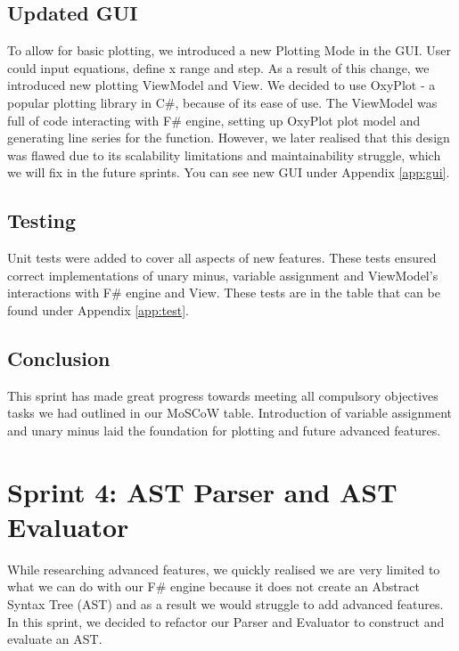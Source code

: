 \documentclass[a4paper, oneside, 11pt]{report}
\begin{document}
\subsection{Updated GUI}
To allow for basic plotting, we introduced a new Plotting Mode in the GUI. User could input equations, define x range and step. As a result of this change, we introduced new plotting ViewModel and View. We decided to use OxyPlot\cite{Oxyplot} - a popular plotting library in C\#, because of its ease of use. The ViewModel was full of code interacting with F\# engine, setting up OxyPlot plot model and generating line series for the function. However, we later realised that this design was flawed due to its scalability limitations and maintainability struggle, which we will fix in the future sprints. You can see new GUI under Appendix \ref{app:gui}.

\subsection{Testing}
Unit tests were added to cover all aspects of new features. These tests ensured correct implementations of unary minus, variable assignment and ViewModel’s interactions with F\# engine and View. These tests are in the table that can be found under Appendix \ref{app:test}.


\subsection{Conclusion}
This sprint has made great progress towards meeting all compulsory objectives tasks we had outlined in our MoSCoW table. Introduction of variable assignment and unary minus laid the foundation for plotting and future advanced features.



\section{Sprint 4: AST Parser and AST Evaluator}
While researching advanced features, we quickly realised we are very limited to what we can do with our F\# engine because it does not create an Abstract Syntax Tree (AST) and as a result we would struggle to add advanced features. In this sprint, we decided to refactor our Parser and Evaluator to construct and evaluate an AST.
\end{document}
